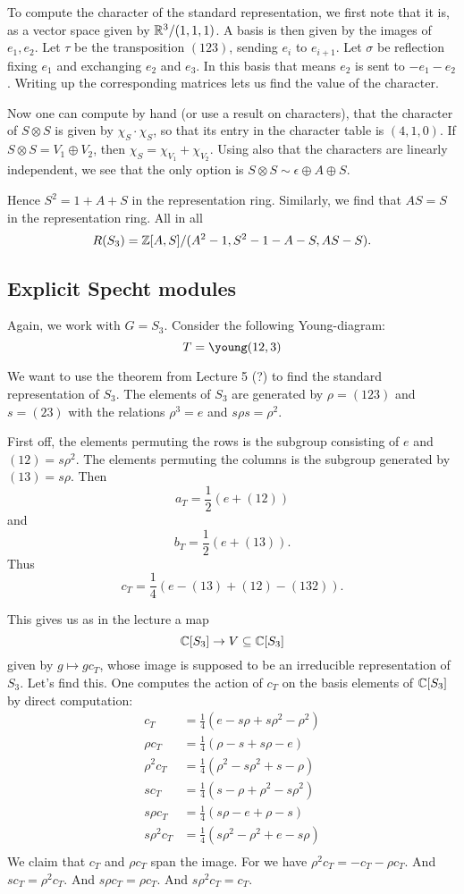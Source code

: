 \documentclass[11pt, english]{article}
\begin{document}
To compute the character of the standard representation, we first note that it is, as a vector space given by $\mathbb{R}^3/(1,1,1)$. A basis is then given by the images of $e_1,e_2$. Let $\tau$ be the transposition $(123)$, sending $e_i$ to $e_{i+1}$. Let $\sigma$ be reflection fixing $e_1$ and exchanging $e_2$ and $e_3$. In this basis that means $e_2$ is sent to $-e_1-e_2$. Writing up the corresponding matrices lets us find the value of the character.

Now one can compute by hand (or use a result on characters), that the character of $S \otimes S$ is given by $\chi_S \cdot \chi_S$, so that its entry in the character table is $(4,1,0)$. If $S \otimes S = V_1 \oplus V_2$, then $\chi_S = \chi_{V_1} + \chi_{V_2}$. Using also that the characters are linearly independent, we see that the only option is $S \otimes S \sim \epsilon \oplus A \oplus S$.

Hence $S^2=1+A+S$ in the representation ring. Similarly, we find that $AS=S$ in the representation ring. All in all
$$
R(S_3) = \mathbb{Z}[A,S]/(A^2-1,S^2-1-A-S,AS-S).
$$

\subsection{Explicit Specht modules}

Again, we work with $G=S_3$. Consider the following Young-diagram:
$$
T = \young(12,3)
$$

We want to use the theorem from Lecture 5 (?) to find the standard representation of $S_3$. The elements of $S_3$ are generated by $\rho=(123)$ and $s=(23)$ with the relations $\rho^3=e$ and $s\rho s =\rho^2$. 

First off, the elements permuting the rows is the subgroup consisting of $e$ and $(12)=s\rho^2$. The elements permuting the columns is the subgroup generated by $(13)=s\rho$. Then
$$
a_T = \frac 12 \left(e+(12)\right)
$$
and
$$
b_T = \frac 12 \left( e+(13) \right).
$$
Thus
$$
c_T= \frac 14 \left( e -(13) + (12)-(132) \right).
$$

This gives us as in the lecture a map
$$
\mathbb{C}[S_3] \to V \subseteq \mathbb{C}[S_3]
$$
given by $g \mapsto g c_T$, whose image is supposed to be an irreducible representation of $S_3$. Let's find this. One computes the action of $c_T$ on the basis elements of $\mathbb{C}[S_3]$ by direct computation:
\begin{align*}
  c_T      &= \frac 14 \left( e -s\rho  + s\rho^2-\rho^2 \right) \\
 \rho c_T  &= \frac 14 \left( \rho - s + s\rho -e \right) \\
 \rho^2 c_T &= \frac 14 \left( \rho^2 - s\rho^2 + s -\rho \right) \\
sc_T &= \frac 14 \left( s-\rho + \rho^2-s\rho^2 \right)  \\
s \rho c_T &= \frac 14 \left( s \rho -e+\rho-s \right) \\
s \rho^2 c_T &= \frac 14 \left( s\rho^2-\rho^2+e - s\rho \right) \\
\end{align*}
We claim that $c_T$ and $\rho c_T$ span the image. For we have $\rho^2 c_T = -c_T-\rho c_T$. And $sc_T=\rho^2 c_T$. And $s \rho c_T = \rho c_T$. And $s \rho^2 c_T = c_T$. 
\end{document}
